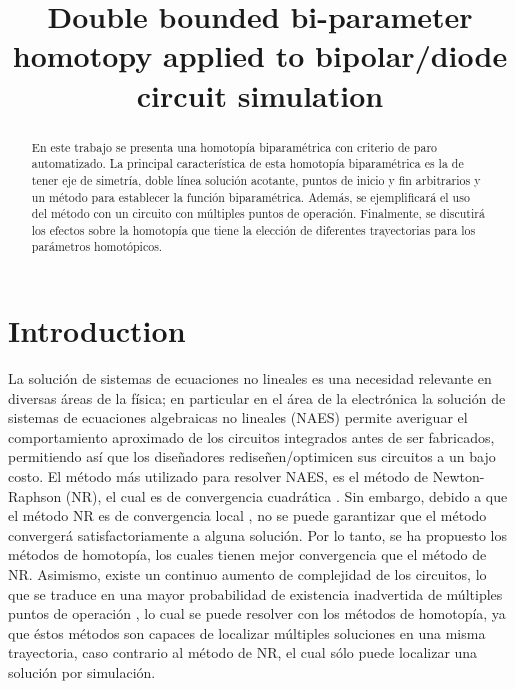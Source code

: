 \documentclass[conference,letterpaper,twocolumn]{IEEEtran}
\begin{document}
\title{Double bounded bi-parameter homotopy applied to bipolar/diode circuit simulation}

\author{
\and
{}
}

\maketitle

\begin{abstract}

En este trabajo se presenta una homotopía biparam\'etrica con criterio de paro automatizado.
La principal característica de esta homotopía biparam\'etrica es la de tener eje de simetría, doble l{\'i}nea
solución acotante, puntos de inicio y fin arbitrarios y un método para establecer la función biparam\'etrica.  
Además, se ejemplificará el uso del método con un circuito con múltiples puntos de operación.
Finalmente, se discutirá los efectos sobre la homotopía que tiene la elección de diferentes trayectorias para
los parámetros homotópicos.
\end{abstract}
 

\section{Introduction} 

La solución de sistemas de ecuaciones no lineales es una necesidad relevante en diversas áreas de la física; en particular 
en el área de la electrónica la solución de sistemas  de ecuaciones algebraicas no lineales (NAES) permite averiguar el
comportamiento aproximado de los circuitos integrados  antes de ser fabricados, permitiendo así que los diseñadores
rediseñen/optimicen sus circuitos a un bajo costo. El método más utilizado para resolver NAES, es el método de Newton-Raphson (NR), el cual
es de convergencia cuadrática \cite{homo_ogrodzki,cont_quasi}. Sin embargo, debido a que el método NR es de convergencia local \cite{cont_quasi,Schwa_book}, no se puede garantizar que
el método convergerá satisfactoriamente a alguna solución.  Por lo tanto, se ha propuesto los métodos de homotopía, los cuales
tienen mejor convergencia que el método de NR. Asimismo, existe un continuo aumento de complejidad de los circuitos, 
lo que se traduce en una mayor probabilidad de existencia inadvertida de múltiples puntos de operación \cite{netwth_4q}, lo cual
se puede resolver con los métodos de homotopía, ya que éstos métodos son capaces de localizar múltiples soluciones en una misma trayectoria, caso contrario al método de NR, el cual sólo puede localizar una solución por simulación.
\end{document}
